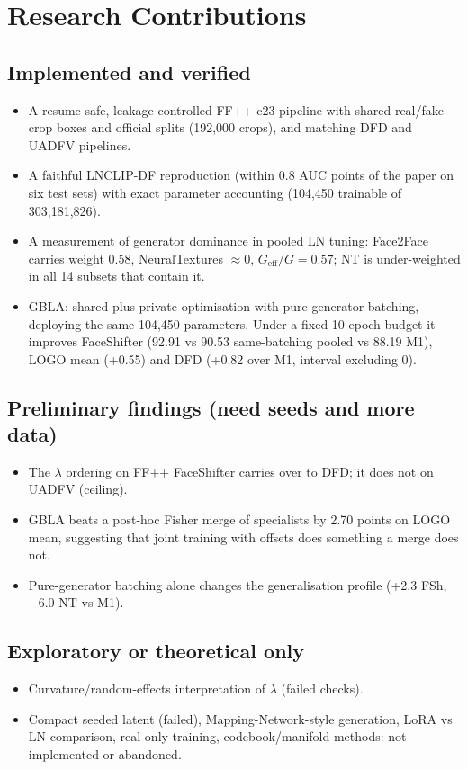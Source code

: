 \documentclass[10pt,a4paper]{article}
\begin{document}
\section{Research Contributions}\label{sec:contrib}
\subsection{Implemented and verified}
\begin{itemize}
\item A resume-safe, leakage-controlled FF++ c23 pipeline with shared real/fake crop boxes and
official splits (192,000 crops), and matching DFD and UADFV pipelines.
\item A faithful LNCLIP-DF reproduction (within 0.8 AUC points of the paper on six test sets) with
exact parameter accounting (104,450 trainable of 303,181,826).
\item A measurement of generator dominance in pooled LN tuning: Face2Face carries weight 0.58,
NeuralTextures \(\approx0\), \(G_\text{eff}/G=0.57\); NT is under-weighted in all 14 subsets that contain it.
\item GBLA: shared-plus-private optimisation with pure-generator batching, deploying the same 104,450
parameters. Under a fixed 10-epoch budget it improves FaceShifter (92.91 vs 90.53 same-batching
pooled vs 88.19 M1), LOGO mean (+0.55) and DFD (+0.82 over M1, interval excluding 0).
\end{itemize}
\subsection{Preliminary findings (need seeds and more data)}
\begin{itemize}
\item The \(\lambda\) ordering on FF++ FaceShifter carries over to DFD; it does not on UADFV (ceiling).
\item GBLA beats a post-hoc Fisher merge of specialists by 2.70 points on LOGO mean, suggesting that
joint training with offsets does something a merge does not.
\item Pure-generator batching alone changes the generalisation profile (+2.3 FSh, \(-6.0\) NT vs M1).
\end{itemize}
\subsection{Exploratory or theoretical only}
\begin{itemize}
\item Curvature/random-effects interpretation of \(\lambda\) (failed checks).
\item Compact seeded latent (failed), Mapping-Network-style generation, LoRA vs LN comparison,
real-only training, codebook/manifold methods: not implemented or abandoned.
\end{itemize}
\end{document}
